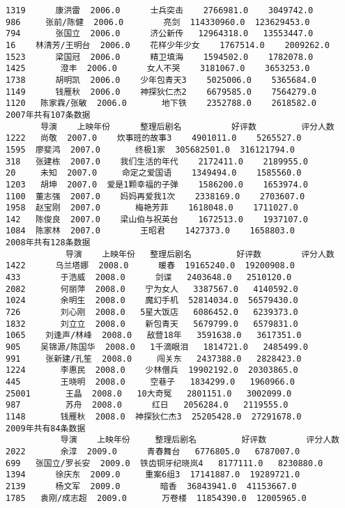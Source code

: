 \documentclass[11pt]{article}
\begin{document}
\begin{Verbatim}[commandchars=\\\{\}]
1319      康洪雷  2006.0      士兵突击    2766981.0    3049742.0
986     张前/陈健  2006.0        亮剑  114330960.0  123629453.0
794       张国立  2006.0      济公新传   12964318.0   13553447.0
16    林清芳/王明台  2006.0    花样少年少女    1767514.0    2009262.0
1523      梁国冠  2006.0      精卫填海    1594502.0    1782078.0
1425       澄丰  2006.0      女人不哭    3181067.0    3653253.0
1738      胡明凯  2006.0    少年包青天3    5025006.0    5365684.0
1149      钱雁秋  2006.0    神探狄仁杰2    6679585.0    7564279.0
1120   陈家霖/张敏  2006.0       地下铁    2352788.0    2618582.0
2007年共有107条数据
       导演    上映年份      整理后剧名          好评数         评分人数
1222   尚敬  2007.0    炊事班的故事3    4901011.0    5265527.0
1595  廖斐鸿  2007.0       终极1家  305682501.0  316121794.0
318   张建栋  2007.0    我们生活的年代    2172411.0    2189955.0
20     未知  2007.0     命定之爱国语    1349494.0    1585560.0
1203   胡坤  2007.0  爱是1颗幸福的子弹    1586200.0    1653974.0
1100  董志强  2007.0    妈妈再爱我1次    2338169.0    2703607.0
1958  赵宝刚  2007.0       梅艳芳菲    1618048.0    1711027.0
142   陈俊良  2007.0    梁山伯与祝英台    1672513.0    1937107.0
1084  陈家林  2007.0        王昭君    1427373.0    1658803.0
2008年共有128条数据
            导演    上映年份   整理后剧名         好评数        评分人数
1422      乌兰塔娜  2008.0      暖春  19165240.0  19200908.0
433        于浩威  2008.0      剑谍   2403648.0   2510120.0
2082       何丽萍  2008.0    宁为女人   3387567.0   4140592.0
1024       余明生  2008.0    魔幻手机  52814034.0  56579430.0
726        刘心刚  2008.0   5星大饭店   6086452.0   6239373.0
1832       刘立立  2008.0    新包青天   5679799.0   6579831.0
1065    刘逢声/林峰  2008.0   敌营18年   3591638.0   3617351.0
905    吴锦源/陈国华  2008.0   1千滴眼泪   1814721.0   2485499.0
991     张新建/孔笙  2008.0     闯关东   2437388.0   2828423.0
1224       李惠民  2008.0    少林僧兵  19902192.0  20303865.0
445        王晓明  2008.0     空巷子   1834299.0   1960966.0
25001       王晶  2008.0   10大奇冤   2801151.0   3002099.0
987         苏舟  2008.0      红日   2056284.0   2119555.0
1148       钱雁秋  2008.0  神探狄仁杰3  25205428.0  27291678.0
2009年共有84条数据
           导演    上映年份     整理后剧名         好评数        评分人数
2022       余淳  2009.0      青春舞台   6776805.0   6787007.0
699   张国立/罗长安  2009.0  铁齿铜牙纪晓岚4   8177111.0   8230880.0
1394      徐庆东  2009.0     重案6组3  17141887.0  19289721.0
2139      杨文军  2009.0        暗香  36843941.0  41153667.0
1785   袁刚/成志超  2009.0       万卷楼  11854390.0  12005965.0

\end{Verbatim}
\end{document}
